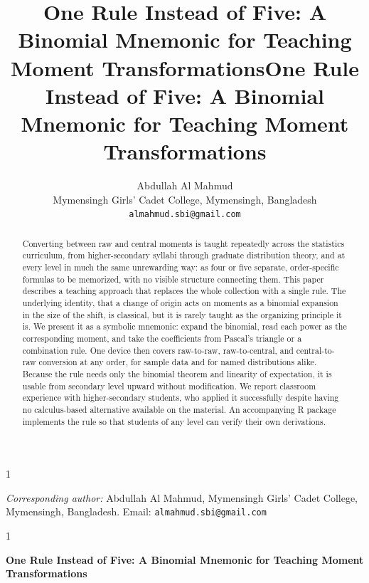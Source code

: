 \documentclass[
  12pt]{article}
\title{One Rule Instead of Five: A Binomial Mnemonic for Teaching Moment Transformations}
\date{}
\newcommand{\anon}{1}
\begin{document}
\def\spacingset#1{\renewcommand{\baselinestretch}{#1}\small\normalsize} \spacingset{1}

\anon
{
  \title{\bf One Rule Instead of Five: A Binomial Mnemonic for Teaching Moment Transformations}
  \author{Abdullah Al Mahmud \\
  Mymensingh Girls' Cadet College, Mymensingh, Bangladesh \\
  \texttt{almahmud.sbi@gmail.com}}
  \maketitle
  \begin{center}
  \textit{Corresponding author:} Abdullah Al Mahmud, Mymensingh Girls' Cadet College,
  Mymensingh, Bangladesh. Email: \texttt{almahmud.sbi@gmail.com}
  \end{center}
} \fi

\anon
{
  \bigskip
  \bigskip
  \bigskip
  \begin{center}
    {\LARGE\bf One Rule Instead of Five: A Binomial Mnemonic for Teaching Moment Transformations}
  \end{center}
  \medskip
} \fi

\bigskip
\begin{abstract}
Converting between raw and central moments is taught repeatedly across the statistics curriculum, from higher-secondary syllabi through graduate distribution theory, and at every level in much the same unrewarding way: as four or five separate, order-specific formulas to be memorized, with no visible structure connecting them. This paper describes a teaching approach that replaces the whole collection with a single rule. The underlying identity, that a change of origin acts on moments as a binomial expansion in the size of the shift, is classical, but it is rarely taught as the organizing principle it is. We present it as a symbolic mnemonic: expand the binomial, read each power as the corresponding moment, and take the coefficients from Pascal's triangle or a combination rule. One device then covers raw-to-raw, raw-to-central, and central-to-raw conversion at any order, for sample data and for named distributions alike. Because the rule needs only the binomial theorem and linearity of expectation, it is usable from secondary level upward without modification. We report classroom experience with higher-secondary students, who applied it successfully despite having no calculus-based alternative available on the material. An accompanying R package implements the rule so that students of any level can verify their own derivations.
\end{abstract}
\end{document}

